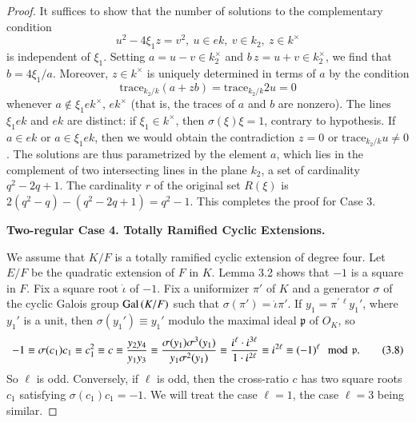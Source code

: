 \documentclass{amsart}
\newcommand\jota{{\dot\iota}}
\newcommand\pp{{\mathfrak p}}
\newcommand\Gal{\hbox{Gal\,}}
\begin{document}
\begin{proof}
It suffices to show that the number of solutions to the
complementary condition
$$u^2-4\xi_1 z = v^2,
\ u\in e k,\ v\in k_2,\ z\in k^\times$$
is independent of $\xi_1$.  Setting $a=u-v\in k_2^\times$ 
and  $b\,z=u+v\in k_2^\times$, we find
that $b=4\xi_1/a$.  Moreover,
$z\in k^\times$ is uniquely determined in terms
of $a$ by the condition
$$\text{trace}_{k_2/k} (a+ z b) = \text{trace}_{k_2/k} 2u = 0$$
whenever $a\not\in \xi_1 e k^\times,\, e k^\times$ 
(that is, the traces of $a$ and $b$
are nonzero).  The lines $\xi_1 e k$ and $e k$ are distinct:
if $\xi_1\in k^\times$, then $\sigma(\xi)\xi=1$, contrary to hypothesis.
If $a\in e k$ or $a\in \xi_1 e k$, then we would obtain the
contradiction $z=0$ or $\text{trace}_{k_2/k} u\ne 0$.
The solutions are thus parametrized by the element $a$,
which lies in the complement of two intersecting lines in 
the plane $k_2$,
a set of cardinality $q^2-2q+1$.  
The
cardinality $r$ of the original set $R(\xi)$ is 
$2(q^2-q) - (q^2-2q+1) = q^2-1$.
This completes the proof for Case 3.

\bigskip
\centerline{\bf Two-regular Case 4. Totally Ramified Cyclic Extensions.}
\bigskip

We assume that $K/F$ is a totally ramified cyclic extension of degree
four.  Let $E/F$ be the quadratic extension of $F$ in $K$.
Lemma 3.2 shows that $-1$ is a square
in $F$.  Fix a square root $\jota$ of $-1$.  Fix a uniformizer
$\pi'$ of $K$ and a generator $\sigma$ of the cyclic
Galois group $\Gal(K/F)$ such that $\sigma(\pi') = \jota \pi'$.
If $y_1 = \pi^{\prime\,\ell} y_1'$, where $y_1'$ is a unit,
then $\sigma(y_1')\equiv y_1'$ modulo the maximal ideal
$\pp$ of $O_K$, so
\begin{equation}
-1\equiv \sigma(c_1)c_1\equiv c_1^2 \equiv c \equiv
{y_2 y_4\over y_1 y_3}\equiv {\sigma(y_1)\sigma^3(y_1)\over
y_1 \sigma^2(y_1)} \equiv {\jota^\ell\cdot\jota^{3\ell}\over
 1\cdot \jota^{2\ell}}\equiv \jota^{2\ell} \equiv (-1)^\ell
\mod \pp.\tag {3.8}
\end{equation}
So $\ell$ is odd.  Conversely, if $\ell$
is odd, then the cross-ratio $c$ has two square roots $c_1$ satisfying
$\sigma(c_1)c_1 = -1$.  
We will treat the case $\ell=1$, the case $\ell=3$ being
similar.  


\end{proof}
\end{document}
